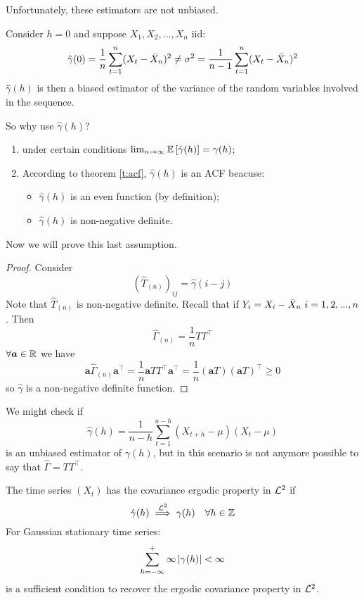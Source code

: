 Unfortunately, these estimators are not unbiased.

\begin{remark}
    Consider $h=0$ and suppose $X_1,X_2,...,X_n$ iid:
    \[
        \hat{\gamma}(0)=\frac{1}{n}\sum_{t=1}^n(X_t-\bar{X}_n)^2\ne\sigma^2=\frac{1}{n-1}\sum_{t=1}^n(X_t-\bar{X}_n)^2
    \]
    $\hat{\gamma}(h)$ is then a biased estimator of the variance of the random variables involved in the sequence.
\end{remark}

So why use $\hat{\gamma}(h)$?
\begin{enumerate}
    \item under certain conditions $\lim_{n\to\infty}\mathbb{E}\left[\hat{\gamma}(h)\right]=\gamma(h)$;
    \item According to theorem \ref{t:acf}, $\hat{\gamma}(h)$ is an ACF beacuse:
    \begin{itemize}
        \item $\hat{\gamma}(h)$ is an even function (by definition);
        \item $\hat{\gamma}(h)$ is non-negative definite.
    \end{itemize}
\end{enumerate}

Now we will prove this last assumption.

\begin{proof}
    Consider
    \[
        \left(\hat{T}_{(n)}\right)_{ij}=\hat{\gamma}(i-j)  
    \]
    Note that $\hat{T}_{(n)}$ is non-negative definite. Recall that if $Y_i=X_i-\bar{X}_n\ i=1,2,...,n$. Then
    \[
        \hat{\Gamma}_{(n)}=\frac{1}{n}TT^\intercal    
    \]
    $\forall \boldsymbol{a}\in\mathbb{R}$ we have
    \[
        \boldsymbol{a}\hat{\Gamma}_{(n)}\boldsymbol{a}^\intercal=\frac{1}{n}\boldsymbol{a}TT^\intercal\boldsymbol{a}^\intercal=\frac{1}{n}\left(\boldsymbol{a}T\right)\left(\boldsymbol{a}T\right)^\intercal\ge0
    \]
    so $\hat{\gamma}$ is a non-negative definite function.
\end{proof}

\begin{remark}
    We might check if 
    \[
        \hat{\gamma}(h)=\frac{1}{n-h}\sum_{t=1}^{n-h}(X_{t+h}-\mu)(X_t-\mu)  
    \]
    is an unbiased estimator of $\gamma(h)$, but in this scenario is not anymore possible to say that $\hat{\Gamma}=TT^\intercal$.
\end{remark}

\begin{definition}
    The time series $(X_t)$ has the covariance ergodic property in $\mathcal{L}^{2}$ if
    \[
        \hat{\gamma}(h)\stackrel{\el{2}}{\implies}\gamma(h)\ \ \ \forall h\in\Z  
    \]
    For Gaussian stationary time series:
    \[
        \sum_{h=-\infty}^+\infty\left|\gamma(h)\right|<\infty  
    \]
    is a sufficient condition to recover the ergodic covariance property in $\mathcal{L}^{2}$.
\end{definition}

